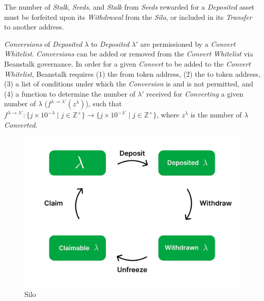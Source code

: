 \documentclass[tikz]{article}
\newcommand{\term}[1]{\textsl{#1}}
\begin{document}
The number of \term{Stalk}, \term{Seeds}, and \term{Stalk} from \term{Seeds} rewarded for a \term{Deposited} asset must be forfeited upon its \term{Withdrawal} from the \term{Silo}, or included in its \term{Transfer} to another address. 

\term{Conversions} of \term{Deposited} $\lambda$ to \term{Deposited} $\lambda'$ are permissioned by a \term{Convert} \term{Whitelist}. \term{Conversions} can be added or removed from the \term{Convert} \term{Whitelist} via Beanstalk governance. In order for a given \term{Convert} to be added to the \term{Convert} \term{Whitelist}, Beanstalk requires (1) the from token address, (2) the to token address, (3) a list of conditions under which the \term{Conversion} is and is not permitted, and (4) a function to determine the number of $\lambda'$ received for \term{Converting} a given number of $\lambda$ ($f^{\lambda \rightarrow \lambda'}(z^{\lambda})$), such that $f^{\lambda \rightarrow \lambda'}\colon \{j \times 10^{-\lambda} \mid j \in \mathbb{Z}^{+} \} \rightarrow \{j \times 10^{-\lambda'} \mid j \in \mathbb{Z}^{+} \}$, where $z^{\lambda}$ is the number of $\lambda$ \term{Converted}. 

\begin{figure}[h!]
    \centering
    \includegraphics[scale=.16]{Figure1}
    \vspace*{-5mm}
    \caption{Silo}
    \label{fig 1}
\end{figure}
\end{document}

